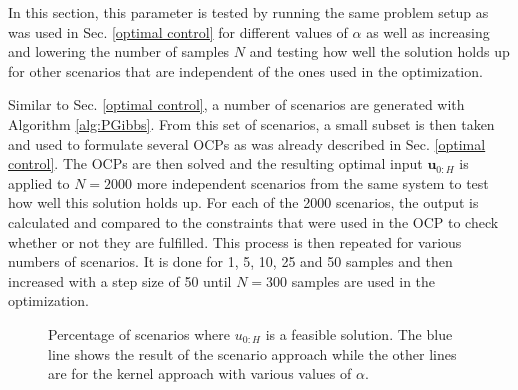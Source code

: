 In this section, this parameter is tested by running the same problem setup as was used in Sec. \ref{optimal control} for different values of $\alpha$ as well as increasing and lowering the number of samples $N$ and testing how well the solution holds up for other scenarios that are independent of the ones used in the optimization.

Similar to Sec. \ref{optimal control}, a number of scenarios are generated with Algorithm \ref{alg:PGibbs}. From this set of scenarios, a small subset is then taken and used to formulate several OCPs as was already described in Sec. \ref{optimal control}. The OCPs are then solved and the resulting optimal input $\boldsymbol{u}_{0:H}$ is applied to $N = 2000$ more independent scenarios from the same system to test how well this solution holds up. For each of the 2000 scenarios, the output is calculated and compared to the constraints that were used in the OCP to check whether or not they are fulfilled. This process is then repeated for various numbers of scenarios. It is done for 1, 5, 10, 25 and 50 samples and then increased with a step size of 50 until $N = 300$ samples are used in the optimization.

\begin{figure}[t]
		\def\file{data/AlphaTest_K300_MaxConstraint_S2.txt}
		
		\centering
		\vspace*{-0.4cm}
		
		\caption{Percentage of scenarios where $u_{0:H}$ is a feasible solution. The blue line shows the result of the scenario approach while the other lines are for the kernel approach with various values of $\alpha$.}
		\label{fig:robustness_plot}
\end{figure}


